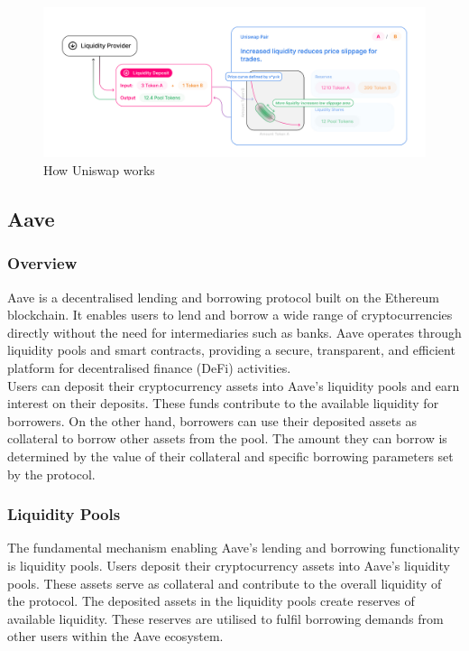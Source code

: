 \begin{figure}[!htb]
    \centering
    \includegraphics[width=\textwidth]{background/Images/uniswap_lp.jpeg}
    \caption{How Uniswap works~\cite{uniswap} \label{fig:uniswap_lp}}
\end{figure}

\subsection{Aave}

\subsubsection{Overview}
Aave is a decentralised lending and borrowing protocol built on the Ethereum blockchain. It enables users to lend and borrow a wide range of cryptocurrencies directly without the need for intermediaries such as banks. Aave operates through liquidity pools and smart contracts, providing a secure, transparent, and efficient platform for decentralised finance (DeFi) activities.
\\[3mm]
Users can deposit their cryptocurrency assets into Aave's liquidity pools and earn interest on their deposits. These funds contribute to the available liquidity for borrowers. On the other hand, borrowers can use their deposited assets as collateral to borrow other assets from the pool. The amount they can borrow is determined by the value of their collateral and specific borrowing parameters set by the protocol.
\subsubsection{Liquidity Pools}
The fundamental mechanism enabling Aave's lending and borrowing functionality is liquidity pools. Users deposit their cryptocurrency assets into Aave's liquidity pools. These assets serve as collateral and contribute to the overall liquidity of the protocol. The deposited assets in the liquidity pools create reserves of available liquidity. These reserves are utilised to fulfil borrowing demands from other users within the Aave ecosystem.
